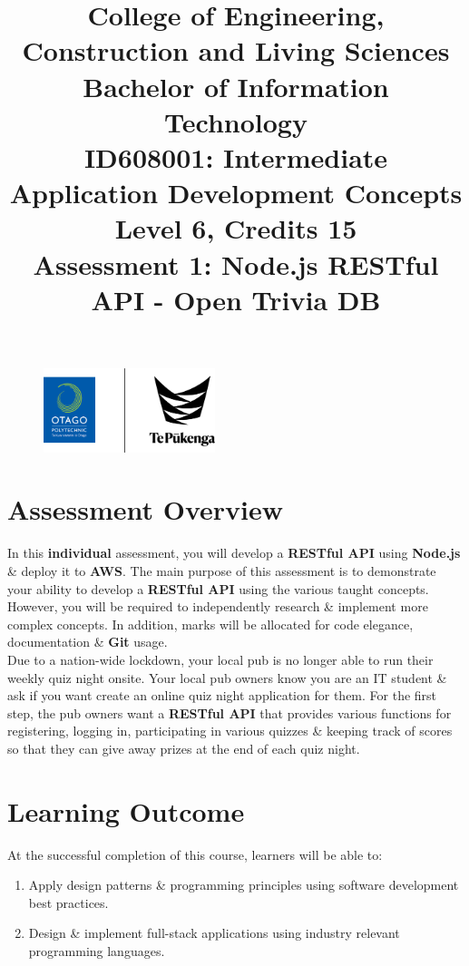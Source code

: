 \documentclass{article}
\author{}
\begin{document}
\begin{figure}
	\centering
	\includegraphics[width=50mm]{../../resources/img/logo.png}
\end{figure}

\title{College of Engineering, Construction and Living Sciences\\Bachelor of Information Technology\\ID608001: Intermediate Application Development Concepts\\Level 6, Credits 15\\\textbf{Assessment 1: Node.js RESTful API - Open Trivia DB}}
\date{}
\maketitle

\section*{Assessment Overview}
In this \textbf{individual} assessment, you will develop a \textbf{RESTful API} using \textbf{Node.js} \& deploy it to \textbf{AWS}. The main purpose of this assessment is to demonstrate your ability to develop a \textbf{RESTful API} using the various taught concepts. However, you will be required to independently research \& implement more complex concepts. In addition, marks will be allocated for code elegance, documentation \& \textbf{Git} usage.\\

Due to a nation-wide lockdown, your local pub is no longer able to run their weekly quiz night onsite. Your local pub owners know you are an IT student \& ask if you want create an online quiz night application for them. For the first step, the pub owners want a \textbf{RESTful API} that provides various functions for registering, logging in, participating in various quizzes \& keeping track of scores so that they can give away prizes at the end of each quiz night.

\section*{Learning Outcome}
At the successful completion of this course, learners will be able to:
\begin{enumerate}
	\item Apply design patterns \& programming principles using software development best practices.
	\item Design \& implement full-stack applications using industry relevant programming languages.
\end{enumerate}
\end{document}

